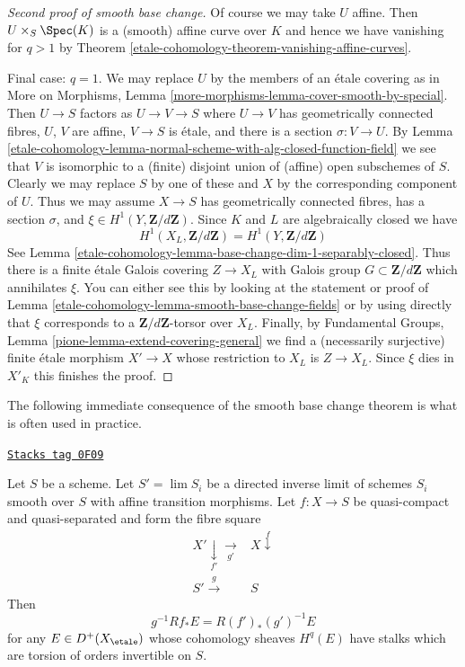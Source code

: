 \begin{proof}[Second proof of smooth base change]
\medskip\noindent
Of course we may take $U$ affine. Then $U \times_S \Spec(K)$
is a (smooth) affine curve over $K$ and hence we have vanishing
for $q > 1$ by Theorem \ref{etale-cohomology-theorem-vanishing-affine-curves}.

\medskip\noindent
Final case: $q = 1$. We may replace $U$ by the members of an
\'etale covering as in More on Morphisms, Lemma
\ref{more-morphisms-lemma-cover-smooth-by-special}.
Then $U \to S$ factors as $U \to V \to S$ where
$U \to V$ has geometrically connected fibres,
$U$, $V$ are affine, $V \to S$ is \'etale, and there is
a section $\sigma : V \to U$. By
Lemma \ref{etale-cohomology-lemma-normal-scheme-with-alg-closed-function-field}
we see that $V$ is isomorphic to a (finite) disjoint union of
(affine) open subschemes of $S$.
Clearly we may replace $S$ by one of these
and $X$ by the corresponding component of $U$.
Thus we may assume $X \to S$ has geometrically connected
fibres, has a section $\sigma$, and
$\xi \in H^1(Y, \mathbf{Z}/d\mathbf{Z})$.
Since $K$ and $L$ are algebraically closed we have
$$
H^1(X_L, \mathbf{Z}/d\mathbf{Z}) =
H^1(Y, \mathbf{Z}/d\mathbf{Z})
$$
See Lemma \ref{etale-cohomology-lemma-base-change-dim-1-separably-closed}.
Thus there is a finite \'etale Galois covering
$Z \to X_L$ with Galois group $G \subset \mathbf{Z}/d\mathbf{Z}$
which annihilates $\xi$.
You can either see this by looking at the statement or
proof of Lemma \ref{etale-cohomology-lemma-smooth-base-change-fields}
or by using directly that $\xi$ corresponds to a
$\mathbf{Z}/d\mathbf{Z}$-torsor over $X_L$.
Finally, by
Fundamental Groups, Lemma \ref{pione-lemma-extend-covering-general}
we find a (necessarily surjective)
finite \'etale morphism $X' \to X$
whose restriction to $X_L$ is $Z \to X_L$.
Since $\xi$ dies in $X'_K$ this finishes the proof.
\end{proof}

The following immediate consequence of the smooth base change
theorem is what is often used in practice.

\begin{lemma}
\label{etale-cohomology-lemma-smooth-base-change-general}
\href{https://stacks.math.columbia.edu/tag/0F09}{\texttt{Stacks tag 0F09}}

Let $S$ be a scheme. Let $S' = \lim S_i$ be a directed inverse
limit of schemes $S_i$ smooth over $S$ with affine transition
morphisms. Let $f : X \to S$ be quasi-compact and quasi-separated
and form the fibre square
$$
\begin{array}{cc}X' \underset{f'}{\downarrow}\underset{g'}{\longrightarrow} & X \overset{f}{\downarrow} \\ S' \overset{g}{\longrightarrow} & S\end{array}
$$
Then
$$
g^{-1}Rf_*E = R(f')_*(g')^{-1}E
$$
for any $E \in D^+(X_\etale)$ whose cohomology sheaves $H^q(E)$
have stalks which are torsion of orders invertible on $S$.
\end{lemma}

